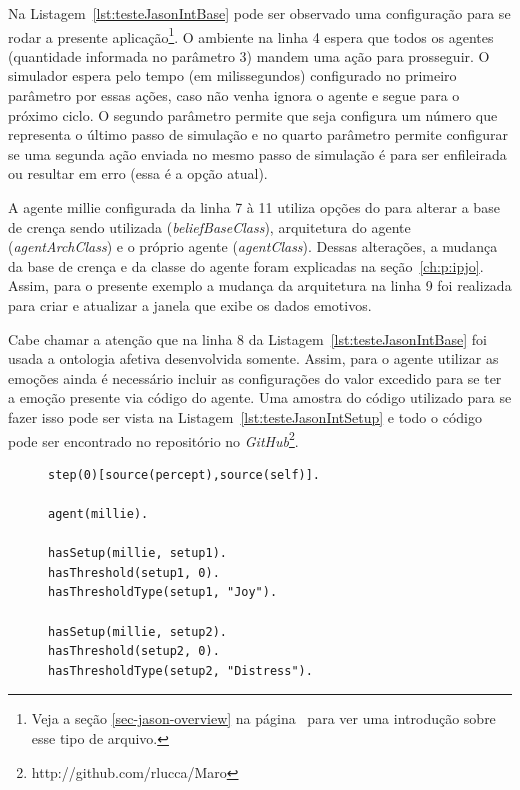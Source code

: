 Na Listagem~\ref{lst:testeJasonIntBase} pode ser observado uma configuração
para se rodar a presente aplicação\footnote{Veja a seção
\ref{sec-jason-overview} na página~\pageref{sec-jason-overview}
para ver uma introdução sobre esse tipo de arquivo.}. O ambiente na linha 4
espera que todos os agentes (quantidade informada no parâmetro 3) mandem
uma ação para prosseguir. O simulador espera pelo tempo (em milissegundos)
configurado no primeiro parâmetro por essas ações, caso não venha ignora o
agente e segue para o próximo ciclo. O segundo parâmetro permite que seja
configura um número que representa o último passo de simulação e no quarto
parâmetro permite configurar se uma segunda ação enviada no mesmo passo de
simulação é para ser enfileirada ou resultar em erro (essa é a opção atual).

\begin{center}
    \begin{minipage}{130mm}
	\lstset{linewidth=130mm}
	
    \end{minipage}
\end{center}

A agente millie configurada da linha 7 à 11 utiliza opções do \jason para
alterar a base de crença sendo utilizada (\emph{beliefBaseClass}),
arquitetura do agente (\emph{agentArchClass}) e o próprio agente
(\emph{agentClass}). Dessas alterações, a mudança da base de crença e da
classe do agente foram explicadas na seção~\ref{ch:p:ipjo}. Assim, para o
presente exemplo a mudança da arquitetura na linha 9 foi realizada para criar
e atualizar a janela que exibe os dados emotivos.

Cabe chamar a atenção que na linha 8 da Listagem~\ref{lst:testeJasonIntBase}
foi usada a ontologia afetiva desenvolvida somente. Assim, para o agente
utilizar as emoções ainda é necessário incluir as configurações do valor
excedido para se ter a emoção presente via código do agente. Uma amostra do
código utilizado para se fazer isso pode ser vista na
Listagem~\ref{lst:testeJasonIntSetup} e todo o código pode ser encontrado no
repositório no \emph{GitHub}\footnote{http://github.com/rlucca/Maro}.

\lstset{linewidth=80mm}
\begin{figure}
	\begin{lstlisting}[frame=trbl,
caption=Parte do código do agente para aplicação interativa de teste,
label=lst:testeJasonIntSetup]
step(0)[source(percept),source(self)].

agent(millie).

hasSetup(millie, setup1).
hasThreshold(setup1, 0).
hasThresholdType(setup1, "Joy").

hasSetup(millie, setup2).
hasThreshold(setup2, 0).
hasThresholdType(setup2, "Distress").
	\end{lstlisting}
\end{figure}

